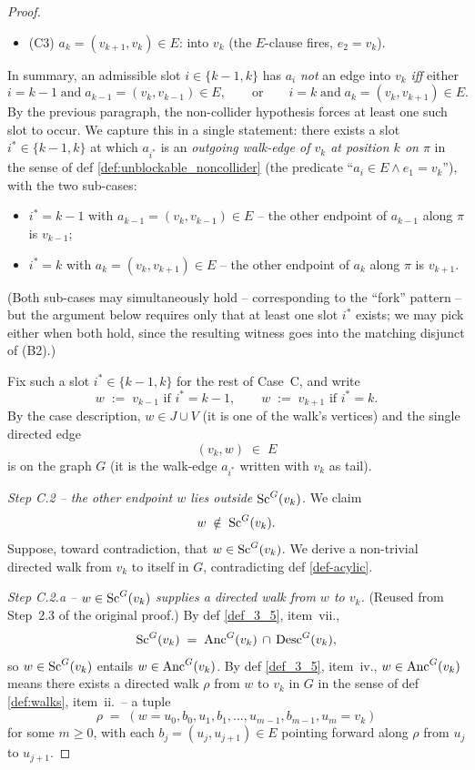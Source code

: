 \documentclass[main]{subfiles}
\begin{document}
\begin{proof}
\begin{itemize}
\begin{itemize}
        \item (C3) $a_k = (v_{k+1}, v_k) \in E$: into $v_k$ (the $E$-clause fires, $e_2 = v_k$).
    \end{itemize}
\end{itemize}
In summary, an admissible slot $i \in \{k - 1, k\}$ has $a_i$ \emph{not} an edge into $v_k$ \emph{iff} either
\[
    i = k - 1 \;\text{and}\; a_{k - 1} = (v_k, v_{k - 1}) \in E,
    \qquad\text{or}\qquad
    i = k \;\text{and}\; a_k = (v_k, v_{k + 1}) \in E.
\]
By the previous paragraph, the non-collider hypothesis forces at least one such slot to occur. We capture this in a single statement: there exists a slot $i^* \in \{k - 1, k\}$ at which $a_{i^*}$ is an \emph{outgoing walk-edge of $v_k$ at position $k$ on $\pi$} in the sense of def \ref{def:unblockable_noncollider} (the predicate ``$a_i \in E \land e_1 = v_k$''), with the two sub-cases:
\begin{itemize}
    \item[(O1)] $i^* = k - 1$ with $a_{k - 1} = (v_k, v_{k - 1}) \in E$ -- the other endpoint of $a_{k - 1}$ along $\pi$ is $v_{k - 1}$;
    \item[(O2)] $i^* = k$ with $a_k = (v_k, v_{k + 1}) \in E$ -- the other endpoint of $a_k$ along $\pi$ is $v_{k + 1}$.
\end{itemize}
(Both sub-cases may simultaneously hold -- corresponding to the ``fork'' pattern -- but the argument below requires only that at least one slot $i^*$ exists; we may pick either when both hold, since the resulting witness goes into the matching disjunct of (B2).)

Fix such a slot $i^* \in \{k - 1, k\}$ for the rest of Case~C, and write
\[
    w \;:=\; v_{k - 1} \text{ if } i^* = k - 1, \qquad w \;:=\; v_{k + 1} \text{ if } i^* = k.
\]
By the case description, $w \in J \cup V$ (it is one of the walk's vertices) and the single directed edge
\[
    (v_k, w) \;\in\; E
\]
is on the graph $G$ (it is the walk-edge $a_{i^*}$ written with $v_k$ as tail).

\smallskip\noindent\emph{Step C.2 -- the other endpoint $w$ lies outside $\mathrm{Sc}^G(v_k)$.}
We claim
\[
    w \;\notin\; \mathrm{Sc}^G(v_k).
\]
Suppose, toward contradiction, that $w \in \mathrm{Sc}^G(v_k)$. We derive a non-trivial directed walk from $v_k$ to itself in $G$, contradicting def \ref{def-acylic}.

\smallskip\noindent\emph{Step C.2.a -- $w \in \mathrm{Sc}^G(v_k)$ supplies a directed walk from $w$ to $v_k$.}
(Reused from Step~2.3 of the original proof.) By def \ref{def_3_5}, item~vii.,
\[
    \mathrm{Sc}^G(v_k) \;=\; \mathrm{Anc}^G(v_k) \,\cap\, \mathrm{Desc}^G(v_k),
\]
so $w \in \mathrm{Sc}^G(v_k)$ entails $w \in \mathrm{Anc}^G(v_k)$. By def \ref{def_3_5}, item~iv., $w \in \mathrm{Anc}^G(v_k)$ means there exists a directed walk $\rho$ from $w$ to $v_k$ in $G$ in the sense of def \ref{def:walks}, item~ii.\ -- a tuple
\[
    \rho \;=\; (w = u_0, b_0, u_1, b_1, \dots, u_{m-1}, b_{m-1}, u_m = v_k)
\]
for some $m \ge 0$, with each $b_j = (u_j, u_{j+1}) \in E$ pointing forward along $\rho$ from $u_j$ to $u_{j+1}$.


\end{proof}
\end{document}
